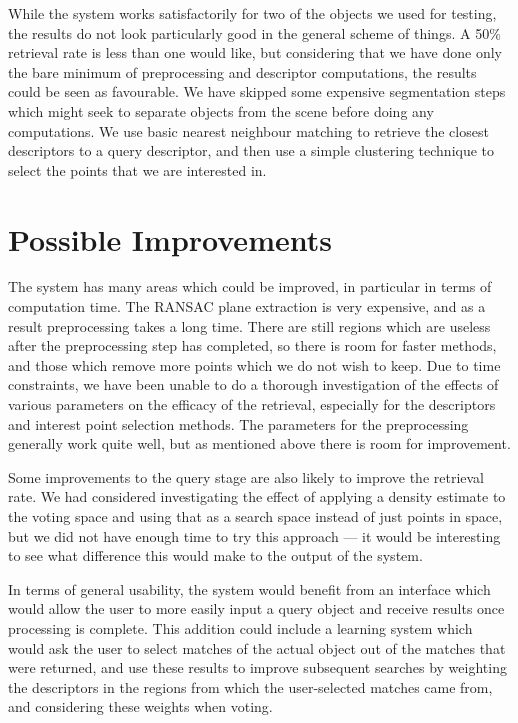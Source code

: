 \documentclass[11pt,a4paper]{kth-mag}
\begin{document}
While the system works satisfactorily for two of the objects we used for
testing, the results do not look particularly good in the general scheme of
things. A 50\% retrieval rate is less than one would like, but considering that
we have done only the bare minimum of preprocessing and descriptor computations,
the results could be seen as favourable. We have skipped some expensive
segmentation steps which might seek to separate objects from the scene before
doing any computations. We use basic nearest neighbour matching to retrieve the
closest descriptors to a query descriptor, and then use a simple clustering
technique to select the points that we are interested in.

\section{Possible Improvements}
The system has many areas which could be improved, in particular in terms of
computation time. The RANSAC plane extraction is very expensive, and as a result
preprocessing takes a long time. There are still regions which are useless after
the preprocessing step has completed, so there is room for faster methods, and
those which remove more points which we do not wish to keep. Due to time
constraints, we have been unable to do a thorough investigation of the effects
of various parameters on the efficacy of the retrieval, especially for the
descriptors and interest point selection methods. The parameters for the
preprocessing generally work quite well, but as mentioned above there is room
for improvement.

Some improvements to the query stage are also likely to improve the retrieval
rate. We had considered investigating the effect of applying a density estimate
to the voting space and using that as a search space instead of just points in
space, but we did not have enough time to try this approach --- it would be
interesting to see what difference this would make to the output of the system.

In terms of general usability, the system would benefit from an interface which
would allow the user to more easily input a query object and receive results
once processing is complete. This addition could include a learning system which
would ask the user to select matches of the actual object out of the matches
that were returned, and use these results to improve subsequent searches by
weighting the descriptors in the regions from which the user-selected matches
came from, and considering these weights when voting.
\printbibliography
\end{document}
